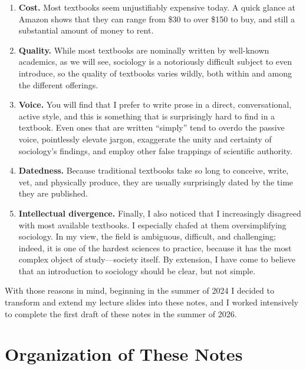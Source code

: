 \documentclass[
  letterpaper,
  DIV=11,
  numbers=noendperiod,
  oneside]{scrartcl}
\providecommand{\tightlist}{%
  \setlength{\itemsep}{0pt}\setlength{\parskip}{0pt}}
\begin{document}
\begin{enumerate}
\def\labelenumi{\arabic{enumi}.}
\tightlist
\item
  \textbf{Cost.} Most textbooks seem unjustifiably expensive today. A
  quick glance at Amazon shows that they can range from \$30 to over
  \$150 to buy, and still a substantial amount of money to rent.
\item
  \textbf{Quality.} While most textbooks are nominally written by
  well-known academics, as we will see, sociology is a notoriously
  difficult subject to even introduce, so the quality of textbooks
  varies wildly, both within and among the different offerings.
\item
  \textbf{Voice.} You will find that I prefer to write prose in a
  direct, conversational, active style, and this is something that is
  surprisingly hard to find in a textbook. Even ones that are written
  ``simply'' tend to overdo the passive voice, pointlessly elevate
  jargon, exaggerate the unity and certainty of sociology's findings,
  and employ other false trappings of scientific authority.
\item
  \textbf{Datedness.} Because traditional textbooks take so long to
  conceive, write, vet, and physically produce, they are usually
  surprisingly dated by the time they are published.
\item
  \textbf{Intellectual divergence.} Finally, I also noticed that I
  increasingly disagreed with most available textbooks. I especially
  chafed at them oversimplifying sociology. In my view, the field is
  ambiguous, difficult, and challenging; indeed, it is one of the
  hardest sciences to practice, because it has the most complex object
  of study---society itself. By extension, I have come to believe that
  an introduction to sociology should be clear, but not simple.
\end{enumerate}

With those reasons in mind, beginning in the summer of 2024 I decided to
transform and extend my lecture slides into these notes, and I worked
intensively to complete the first draft of these notes in the summer of
2026.

\section{Organization of These Notes}\label{organization-of-these-notes}
\end{document}

